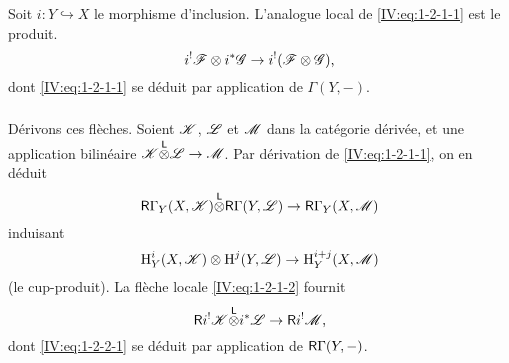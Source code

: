 Soit $i:Y\hookrightarrow X$ le morphisme d'inclusion. L'analogue local de 
\eqref{IV:eq:1-2-1-1} est le produit.
\begin{equation}\label{IV:eq:1-2-1-2}
  i^!\mathscr{F}\otimes i^*\mathscr{G} \to i^!(\mathscr{F}\otimes\mathscr{G}) \text{,}
\end{equation}
dont \eqref{IV:eq:1-2-1-1} se d\'eduit par application de $\Gamma(Y,-)$. 





\subsubsection{}\label{IV:1-2-2}

D\'erivons ces fl\`eches. Soient $\mathscr{K}$, $\mathscr{L}$ et $\mathscr{M}$ dans la cat\'egorie 
d\'eriv\'ee, et une application bilin\'eaire $\mathscr{K}{\overset{\mathsf{L}}{\otimes}}\mathscr{L}\to\mathscr{M}$. Par 
d\'erivation de \eqref{IV:eq:1-2-1-1}, on en d\'eduit 
\begin{equation}\label{IV:eq:1-2-2-1}
  \mathsf{R}\Gamma_Y(X,\mathscr{K}) {\overset{\mathsf{L}}{\otimes}} \mathsf{R}\Gamma(Y,\mathscr{L}) \to \mathsf{R}\Gamma_Y(X,\mathscr{M}) 
\end{equation}
induisant 
\begin{equation}\label{IV:eq:1-2-2-2}
  \operatorname{H}_Y^i(X,\mathscr{K})\otimes \operatorname{H}^j(Y,\mathscr{L}) \to \operatorname{H}_Y^{i+j}(X,\mathscr{M})
\end{equation}
(le cup-produit). La fl\`eche locale \eqref{IV:eq:1-2-1-2} fournit 
\begin{equation}\label{IV:eq:1-2-2-3}
  \mathsf{R} i^! \mathscr{K}{\overset{\mathsf{L}}{\otimes}} i^*\mathscr{L} \to \mathsf{R} i^!\mathscr{M} \text{,}
\end{equation}
dont \eqref{IV:eq:1-2-2-1} se d\'eduit par application de $\mathsf{R}\Gamma(Y,-)$. 





\subsubsection{}\label{IV:1-2-3}

